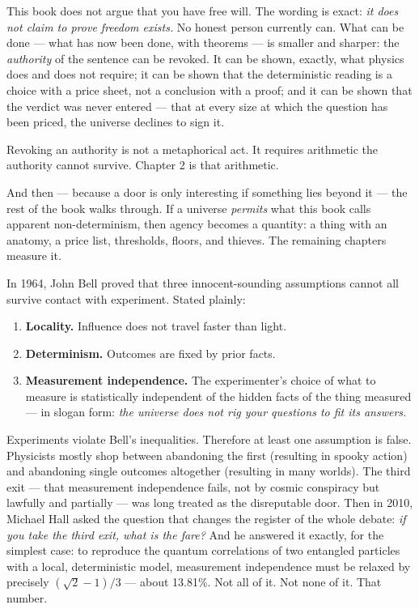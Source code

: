 This book does not argue that you have free will. The wording is
exact: \emph{it does not claim to prove freedom exists.} No honest person currently can. What can
be done --- what has now been done, with theorems --- is smaller and
sharper: the \emph{authority} of the sentence can be revoked. It can be shown,
exactly, what physics does and does not require; it can be shown that
the deterministic reading is a choice with a price sheet, not a
conclusion with a proof; and it can be shown that the verdict
was never entered --- that at every size at which the question has been
priced, the universe declines to sign it.

Revoking an authority is not a metaphorical act. It requires arithmetic
the authority cannot survive. Chapter 2 is that arithmetic.

And then --- because a door is only interesting if something lies beyond
it --- the rest of the book walks through. If a universe \emph{permits} what this
book calls apparent non-determinism, then agency becomes a quantity: a
thing with an anatomy, a price list, thresholds, floors, and thieves.
The remaining chapters measure it.


In 1964, John Bell proved that three innocent-sounding assumptions
cannot all survive contact with experiment. Stated plainly:

\begin{enumerate}
\def\labelenumi{\arabic{enumi}.}
\tightlist
\item
  \textbf{Locality.} Influence does not travel faster than light.
\item
  \textbf{Determinism.} Outcomes are fixed by prior facts.
\item
  \textbf{Measurement independence.} The experimenter's choice of what to
  measure is statistically independent of the hidden facts of the thing
  measured --- in slogan form: \emph{the universe does not rig your questions
  to fit its answers.}
\end{enumerate}

Experiments violate Bell's inequalities. Therefore at least one
assumption is false. Physicists mostly shop between abandoning the
first (resulting in spooky action) and abandoning single outcomes altogether (resulting in many
worlds). The third exit --- that measurement independence fails, not by
cosmic conspiracy but lawfully and partially --- was long treated as the
disreputable door. Then in 2010, Michael Hall asked the question that
changes the register of the whole debate: \emph{if you take the third exit,
what is the fare?} And he answered it exactly, for the simplest case:
to reproduce the quantum correlations of two entangled particles with a
local, deterministic model, measurement independence must be relaxed by
precisely \((\sqrt{2}-1)/3\) --- about 13.81\%. Not all of it. Not none of it.
That number.

